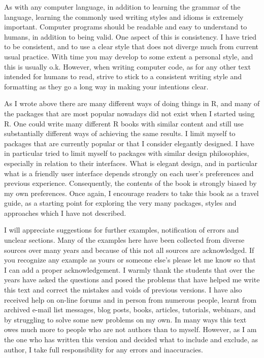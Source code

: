 As with any computer language, in addition to learning the grammar of the language, learning the commonly used writing styles and idioms is extremely important. Computer programs should be readable and easy to understand to humans, in addition to being valid. One aspect of this is consistency. I have tried to be consistent, and to use a clear style that does not diverge much from current usual practice. With time you may develop to some extent a personal style, and this is usually o.k. However, when writing computer code, as for any other text intended for humans to read, strive to stick to a consistent writing style and formatting as they go a long way in making your intentions clear.

As I wrote above there are many different ways of doing things in R, and many of the packages that are most popular nowadays did not exist when I started using R. One could write many different R books with similar content and still use substantially different ways of achieving the same results. I limit myself to packages that are currently popular or that I consider elegantly designed. I have in particular tried to limit myself to packages with similar design philosophies, especially in relation to their interfaces. What is elegant design, and in particular what is a friendly user interface depends strongly on each user's preferences and previous experience. Consequently, the contents of the book is strongly biased by my own preferences. Once again, I encourage readers to take this book as a travel guide, as a starting point for exploring the very many packages, styles and approaches which I have not described.

I will appreciate suggestions for further examples, notification of errors and unclear sections. Many of the examples here have been collected from diverse sources over many years and because of this not all sources are acknowledged. If you recognize any example as yours or someone else's please let me know so that I can add a proper acknowledgement. I warmly thank the students that over the years have asked the questions and posed the problems that have helped me write this text and correct the mistakes and voids of previous versions. I have also received help on on-line forums and in person from numerous people, learnt from archived e-mail list messages, blog posts, books, articles, tutorials, webinars, and by struggling to solve some new problems on my own. In many ways this text owes much more to people who are not authors than to myself. However, as I am the one who has written this version and decided what to include and exclude, as author, I take full responsibility for any errors and inaccuracies.

